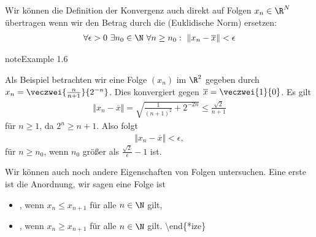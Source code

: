 \documentclass[letterpaper,10pt,english]{jupyterBook}
\begin{document}
Wir können die Definition der Konvergenz auch direkt auf Folgen \(x_n \in \R^N\) übertragen wenn wir den Betrag durch die (Euklidische Norm) ersetzen:
\begin{equation*}
\begin{split} \forall \epsilon > 0 ~\exists n_0 \in \N ~\forall n \geq n_0: ~\Vert x_n - \overline{x} \Vert < \epsilon \end{split}
\end{equation*}\label{vorkurs/folgen:example-6}
\begin{sphinxadmonition}{note}{Example 1.6}



Als Beispiel betrachten wir eine Folge \((x_n)\) im \(\R^2\) gegeben durch \(x_n= \veczwei{\frac{n}{n+1}}{2^{-n}}\). Dies konvergiert gegen \(\overline{x}=\veczwei{1}{0}\). Es gilt
\begin{equation*}
\begin{split} \Vert x_n - \overline{x} \Vert = \sqrt{\frac{1}{(n+1)^2} + 2^{-2n}} \leq \frac{\sqrt{2}}{n+1} \end{split}
\end{equation*}
für \(n \geq 1\), da \(2^n \geq n+1\). Also folgt
\begin{equation*}
\begin{split} \Vert x_n - \overline{x} \Vert < \epsilon, \end{split}
\end{equation*}
für \(n \geq n_0\), wenn \(n_0\) größer als \(\frac{\sqrt{2}}\epsilon -1\) ist.
\end{sphinxadmonition}

Wir können auch noch andere Eigenschaften von Folgen untersuchen. Eine erste ist die Anordnung, wir sagen eine Folge ist
\begin{itemize}
\item {} 
, wenn \(x_n \leq x_{n+1}\) für alle \(n\in \N\) gilt,

\item {} 
, wenn \(x_n \geq x_{n+1}\) für alle \(n\in \N\) gilt.
\textbackslash{}end\{*ize\}

\end{itemize}
\end{document}
